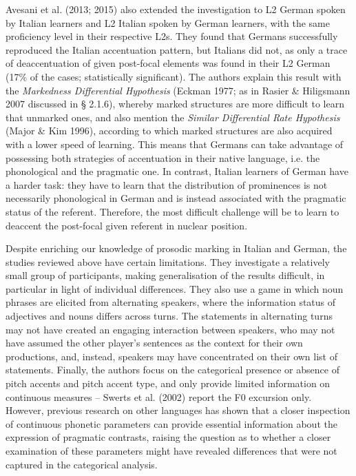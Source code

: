 \begin{styleStandard}
Avesani et al. (2013; 2015) also extended the investigation to L2 German spoken by Italian learners and L2 Italian spoken by German learners, with the same proficiency level in their respective L2s. They found that Germans successfully reproduced the Italian accentuation pattern, but Italians did not, as only a trace of deaccentuation of given post-focal elements was found in their L2 German (17\% of the cases; statistically significant). The authors explain this result with the \textit{Markedness Differential Hypothesis} (Eckman 1977; as in Rasier \& Hiligsmann 2007 discussed in § 2.1.6), whereby marked structures are more difficult to learn that unmarked ones, and also mention the \textit{Similar Differential Rate Hypothesis} (Major \& Kim 1996), according to which marked structures are also acquired with a lower speed of learning. This means that Germans can take advantage of possessing both strategies of accentuation in their native language, i.e. the phonological and the pragmatic one. In contrast, Italian learners of German have a harder task: they have to learn that the distribution of prominences is not necessarily phonological in German and is instead associated with the pragmatic status of the referent. Therefore, the most difficult challenge will be to learn to deaccent the post-focal given referent in nuclear position.
\end{styleStandard}

\begin{styleStandard}
Despite enriching our knowledge of prosodic marking in Italian and German, the studies reviewed above have certain limitations. They investigate a relatively small group of participants, making generalisation of the results difficult, in particular in light of individual differences. They also use a game in which noun phrases are elicited from alternating speakers, where the information status of adjectives and nouns differs across turns. The statements in alternating turns may not have created an engaging interaction between speakers, who may not have assumed the other player’s sentences as the context for their own productions, and, instead, speakers may have concentrated on their own list of statements. Finally, the authors focus on the categorical presence or absence of pitch accents and pitch accent type, and only provide limited information on continuous measures – Swerts et al. (2002) report the F0 excursion only. However, previous research on other languages has shown that a closer inspection of continuous phonetic parameters can provide essential information about the expression of pragmatic contrasts, raising the question as to whether a closer examination of these parameters might have revealed differences that were not captured in the categorical analysis.
\end{styleStandard}

